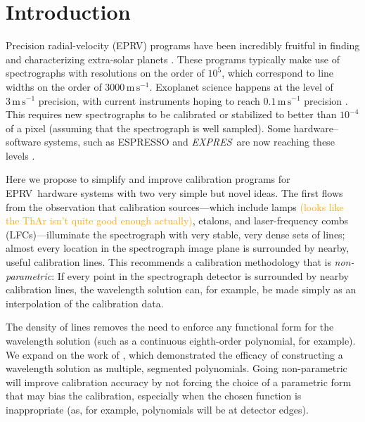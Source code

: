 \documentclass[twocolumn]{aastex63}
\newcommand{\lz}[1]{\textcolor{orange}{#1}}
\newcommand{\project}[1]{\textsl{#1}}
\newcommand{\acronym}[1]{{\small{#1}}}
\newcommand{\expres}{\project{\acronym{EXPRES}}}
\newcommand{\eprv}{\acronym{EPRV}}
\newcommand{\lfc}{\acronym{LFC}}
\newcommand{\mps}{\mathrm{m\,s^{-1}}}
\begin{document}

\section{Introduction} 
Precision radial-velocity (\eprv) programs have been incredibly fruitful in finding and characterizing extra-solar planets \citep{mayor2011, bonfils2013, plavchan2015, butler2017}.  These programs typically make use of spectrographs with resolutions on the order of $10^5$, which correspond to line widths on the order of $3000\,\mps$.  Exoplanet science happens at the level of $3\,\mps$ precision, with current instruments hoping to reach $0.1\,\mps$ precision \citep{fischer2016}.  This requires new spectrographs to be calibrated or stabilized to better than $10^{-4}$ of a pixel (assuming that the spectrograph is well sampled).    Some hardware--software systems, such as ESPRESSO and \expres\ are now reaching these levels \citep{pepe2013,  jurgenson2016, neid, blackman2020}.

Here we propose to simplify and improve calibration programs for \eprv\ hardware systems with two very simple but novel ideas.  The first flows from the observation that calibration sources---which include lamps \lz{(looks like the ThAr isn't quite good enough actually)}, etalons, and laser-frequency combs (\lfc s)---illuminate the spectrograph with very stable, very dense sets of lines; almost every location in the spectrograph image plane is surrounded by nearby, useful calibration lines.  This recommends a calibration methodology that is \emph{non-parametric}:  If every point in the spectrograph detector is surrounded by nearby calibration lines, the wavelength solution can, for example, be made simply as an interpolation of the calibration data.

The density of lines removes the need to enforce any functional form for the wavelength solution (such as a continuous eighth-order polynomial, for example).  We expand on the work of \cite{milakovic2020}, which demonstrated the efficacy of constructing a wavelength solution as multiple, segmented polynomials.  Going non-parametric will improve calibration accuracy by not forcing the choice of a parametric form that may bias the calibration, especially when the chosen function is inappropriate (as, for example, polynomials will be at detector edges).
\end{document}
